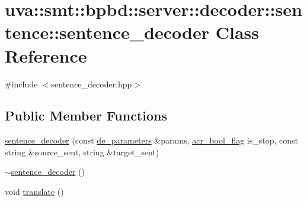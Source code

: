 \hypertarget{classuva_1_1smt_1_1bpbd_1_1server_1_1decoder_1_1sentence_1_1sentence__decoder}{}\section{uva\+:\+:smt\+:\+:bpbd\+:\+:server\+:\+:decoder\+:\+:sentence\+:\+:sentence\+\_\+decoder Class Reference}
\label{classuva_1_1smt_1_1bpbd_1_1server_1_1decoder_1_1sentence_1_1sentence__decoder}


{\ttfamily \#include $<$sentence\+\_\+decoder.\+hpp$>$}

\subsection*{Public Member Functions}
\begin{DoxyCompactItemize}
\item 
\hyperlink{classuva_1_1smt_1_1bpbd_1_1server_1_1decoder_1_1sentence_1_1sentence__decoder_a2826666507da3d8d2c4e2dedf4176578}{sentence\+\_\+decoder} (const \hyperlink{namespaceuva_1_1smt_1_1bpbd_1_1server_1_1decoder_aaf4d5faf3a48156401c854d163d4b848}{de\+\_\+parameters} \&params, \hyperlink{namespaceuva_1_1utils_1_1threads_a1c174d3a90b2b056554d897188ad2c74}{acr\+\_\+bool\+\_\+flag} is\+\_\+stop, const string \&source\+\_\+sent, string \&target\+\_\+sent)
\item 
\hyperlink{classuva_1_1smt_1_1bpbd_1_1server_1_1decoder_1_1sentence_1_1sentence__decoder_a92648ac64b630f1ca59dae720aaeb3a5}{$\sim$sentence\+\_\+decoder} ()
\item 
void \hyperlink{classuva_1_1smt_1_1bpbd_1_1server_1_1decoder_1_1sentence_1_1sentence__decoder_af559ed59a3dc8465e2ad29df1cef5b42}{translate} ()
\end{DoxyCompactItemize}
